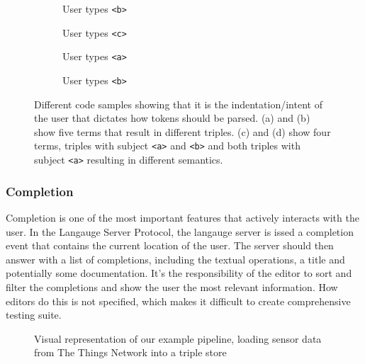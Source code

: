 \begin{figure}[tb]
    \centering
    \begin{subfigure}{0.21\textwidth}
      
      \caption{User types \texttt{<b>}}
      \label{code1}
    \end{subfigure}
    \hfill
    \begin{subfigure}{0.21\textwidth}
      
      \caption{User types \texttt{<c>}}
      \label{code2}
    \end{subfigure}
    \hfill
    \begin{subfigure}{0.21\textwidth}
      
      \caption{User types \texttt{<a>}}
      \label{code3}
    \end{subfigure}
    \hfill
    \begin{subfigure}{0.21\textwidth}
      
      \caption{User types \texttt{<b>}}
      \label{code4}
    \end{subfigure}
    \caption{Different code samples showing that it is the indentation/intent of the user that dictates how tokens should be parsed. (a) and (b) show five terms that result in different triples. (c) and (d) show four terms, triples with subject \texttt{<a>} and \texttt{<b>} and both triples with subject \texttt{<a>} resulting in different semantics.    }\label{lst:GroupedListing}
\end{figure}



\subsubsection*{Completion}

Completion is one of the most important features that actively interacts with the user.
In the Langauge Server Protocol, the langauge server is issed a completion event that contains the current location of the user.
The server should then answer with a list of completions, including the textual operations, a title and potentially some documentation.
It's the responsibility of the editor to sort and filter the completions and show the user the most relevant information.
How editors do this is not specified, which makes it difficult to create comprehensive testing suite.

\begin{figure}[!ht]
 \centering
  \caption{Visual representation of our example pipeline, 
      loading sensor data from The Things Network into a triple store}\label{fig:Completion}
\end{figure}

